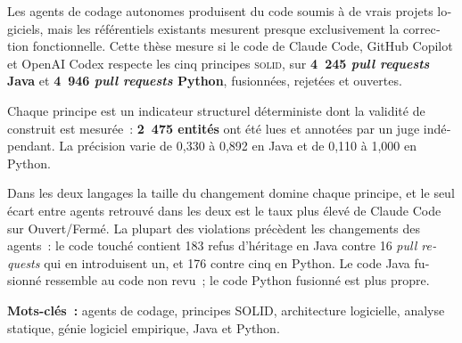 \vspace{0.14cm}
\begin{center}
\end{center}
\vspace{1pt}
\begin{french}
\noindent Les agents de codage autonomes produisent du code soumis \`a de vrais projets logiciels,
mais les r\'ef\'erentiels existants mesurent presque exclusivement la correction fonctionnelle. Cette
th\`ese mesure si le code de Claude Code, GitHub Copilot et OpenAI Codex respecte les cinq principes
\textsc{solid}, sur \textbf{4~245 \emph{pull requests} Java} et
\textbf{4~946 \emph{pull requests} Python}, fusionn\'ees, rejet\'ees et ouvertes.

Chaque principe est un indicateur structurel d\'eterministe dont la validit\'e de construit est
mesur\'ee~: \textbf{2~475 entit\'es} ont \'et\'e lues et annot\'ees par un juge ind\'ependant. La
pr\'ecision varie de 0,330 \`a 0,892 en Java et de 0,110 \`a 1,000 en Python.

Dans les deux langages la taille du changement domine chaque principe, et le seul \'ecart entre
agents retrouv\'e dans les deux est le taux plus \'elev\'e de Claude Code sur Ouvert/Ferm\'e. La
plupart des violations pr\'ec\`edent les changements des agents~: le code touch\'e contient 183 refus
d'h\'eritage en Java contre 16 \emph{pull requests} qui en introduisent un, et 176 contre cinq en
Python. Le code Java fusionn\'e ressemble au code non revu~; le code Python fusionn\'e est plus
propre.
\end{french}

\vspace{2pt}
\begin{french}
\noindent\textbf{Mots-cl\'es~:} agents de codage, principes SOLID, architecture logicielle,
analyse statique, g\'enie logiciel empirique, Java et Python.
\end{french}

\endgroup
